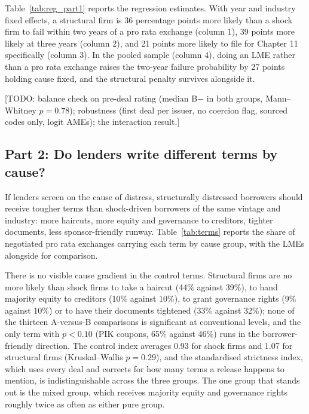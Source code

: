\documentclass[12pt]{article}
\begin{document}


Table~\ref{tab:reg_part1} reports the regression estimates. With year and industry fixed effects, a structural firm is 36 percentage points more likely than a shock firm to fail within two years of a pro rata exchange (column 1), 39 points more likely at three years (column 2), and 21 points more likely to file for Chapter 11 specifically (column 3). In the pooled sample (column 4), doing an LME rather than a pro rata exchange raises the two-year failure probability by 27 points holding cause fixed, and the structural penalty survives alongside it.



[TODO: balance check on pre-deal rating (median B$-$ in both groups, Mann--Whitney $p = 0.78$); robustness (first deal per issuer, no coercion flag, sourced codes only, logit AMEs); the interaction result.]

\subsection{Part 2: Do lenders write different terms by cause?}
\label{sec:p2}

If lenders screen on the cause of distress, structurally distressed borrowers should receive tougher terms than shock-driven borrowers of the same vintage and industry: more haircuts, more equity and governance to creditors, tighter documents, less sponsor-friendly runway. Table~\ref{tab:terms} reports the share of negotiated pro rata exchanges carrying each term by cause group, with the LMEs alongside for comparison.



There is no visible cause gradient in the control terms. Structural firms are no more likely than shock firms to take a haircut (44\% against 39\%), to hand majority equity to creditors (10\% against 10\%), to grant governance rights (9\% against 10\%) or to have their documents tightened (33\% against 32\%); none of the thirteen A-versus-B comparisons is significant at conventional levels, and the only term with $p < 0.10$ (PIK coupons, 65\% against 46\%) runs in the borrower-friendly direction. The control index averages 0.93 for shock firms and 1.07 for structural firms (Kruskal--Wallis $p = 0.29$), and the standardised strictness index, which uses every deal and corrects for how many terms a release happens to mention, is indistinguishable across the three groups. The one group that stands out is the mixed group, which receives majority equity and governance rights roughly twice as often as either pure group.
\end{document}
